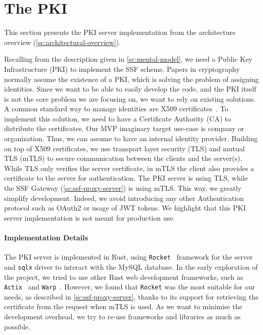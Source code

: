\section{The PKI}\label{sc:PKI}

This section presents the PKI server implementation from the architecture overview (\cref{sc:architectural-overview}).

Recalling from the description given in \cref{sc:mental-model},
we need a Public Key Infrastructure (PKI) to implement the SSF scheme.
Papers in cryptography normally assume the existence of a PKI,
which is solving the problem of assigning identities.
Since we want to be able to easily develop the code, and the PKI itself
is not the core problem we are focusing on, we want to rely on existing
solutions.
A common standard way to manage identities are X509 certificates~\cite{rfc5280}.
To implement this solution, we need to have a Certificate Authority (CA)
to distribute the certificates.
Our MVP imaginary target use-case is company or organization. 
Thus, we can assume to have an internal identity provider.
Building on top of X509 certificates, we use transport
layer security (TLS) and mutual TLS (mTLS) to 
secure communication between the clients and the server(s).
While TLS only verifies the server certificate,
in mTLS the client also provides a certificate to the server
for authentication.
The PKI server is using TLS, while the SSF Gateway (\cref{sc:ssf-proxy-server}) is using mTLS.
This way, we greatly simplify development. Indeed, we 
avoid introducing any other Authentication
protocol such as OAuth2 or usage of JWT tokens.
We highlight that this PKI server implementation is not meant for production use.


\paragraph{Implementation Details} 
The PKI server is implemented in Rust, using \texttt{Rocket}~\cite{Rocket}
framework for the server and \texttt{sqlx} driver to interact
with the MySQL database.
In the early exploration of the project, we tried
to use other Rust web development frameworks,
such as \texttt{Actix}~\cite{Actix} and \texttt{Warp}~\cite{Warp}.
However, we found that \texttt{Rocket} was the most
suitable for our needs, as described in \cref{sc:ssf-proxy-server},
thanks to its support for retrieving the certificate
from the request when mTLS is used.
As we want to minimise the development overhead, we
try to re-use frameworks and libraries as much as possible. 

